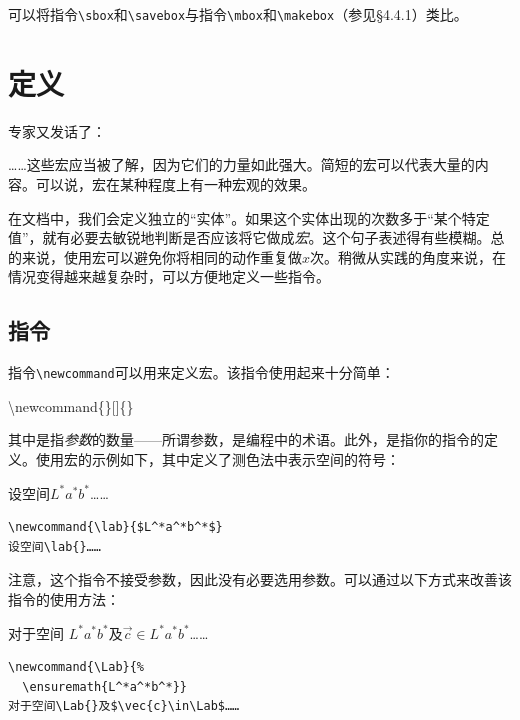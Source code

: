 可以将指令\verb|\sbox|和\verb|\savebox|与指令\verb|\mbox|和\verb|\makebox|（参见\S 4.4.1）类比。

\section{定义}

专家又发话了：

\begin{origincitation}
  ……这些宏应当被了解，因为它们的力量如此强大。简短的宏可以代表大量的内容。可以说，宏在某种程度上有一种宏观的效果。
\end{origincitation}

在文档中，我们会定义独立的“实体”。如果这个实体出现的次数多于“某个特定值”，就有必要去敏锐地判断是否应该将它做成\emph{宏}。这个句子表述得有些模糊。总的来说，使用宏可以避免你将相同的动作重复做$x$次。稍微从实践的角度来说，在情况变得越来越复杂时，可以方便地定义一些指令。

\subsection{指令}

指令\verb|\newcommand|可以用来定义宏。该指令使用起来十分简单：

\begin{dmd}
\backslash newcommand\{\}[]\{\}
\end{dmd}

其中是指\emph{参数}的数量——所谓参数，是编程中的术语。此外，是指你的指令的定义。使用宏的示例如下，其中定义了测色法中表示空间的符号：

\begin{codelist}[4.18]{
  \newcommand{\lab}{$L^*a^*b^*$}
设空间\lab{}……
}
\begin{verbatim}
\newcommand{\lab}{$L^*a^*b^*$}
设空间\lab{}……\end{verbatim}
\end{codelist}

注意，这个指令不接受参数，因此没有必要选用参数。可以通过以下方式来改善该指令的使用方法：

\begin{codelist}[4.19]{
\newcommand{\Lab}{
  \ensuremath{L^*a^*b^*}}
对于空间\Lab{}及$\vec{c}\in\Lab$……
}
\begin{verbatim}
\newcommand{\Lab}{%
  \ensuremath{L^*a^*b^*}}
对于空间\Lab{}及$\vec{c}\in\Lab$……\end{verbatim}
\end{codelist}

